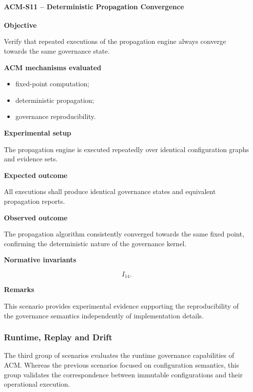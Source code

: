 \documentclass[10pt]{article}
\begin{document}
\paragraph{ACM-S11 -- Deterministic Propagation Convergence}

\textbf{Objective}

Verify that repeated executions of the propagation engine always converge
towards the same governance state.

\textbf{ACM mechanisms evaluated}

\begin{itemize}
    \item fixed-point computation;
    \item deterministic propagation;
    \item governance reproducibility.
\end{itemize}

\textbf{Experimental setup}

The propagation engine is executed repeatedly over identical configuration
graphs and evidence sets.

\textbf{Expected outcome}

All executions shall produce identical governance states and equivalent
propagation reports.

\textbf{Observed outcome}

The propagation algorithm consistently converged towards the same fixed point,
confirming the deterministic nature of the governance kernel.

\textbf{Normative invariants}

\[
I_{14}.
\]

\textbf{Remarks}

This scenario provides experimental evidence supporting the reproducibility of
the governance semantics independently of implementation details.

\subsubsection{Runtime, Replay and Drift}
\label{app:scenario_group_c}

The third group of scenarios evaluates the runtime governance capabilities of
ACM. Whereas the previous scenarios focused on configuration semantics, this
group validates the correspondence between immutable configurations and their
operational execution.
\end{document}
